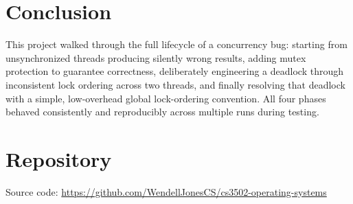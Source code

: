 \documentclass[11pt]{article}
\begin{document}
\section{Conclusion}
This project walked through the full lifecycle of a concurrency bug: starting
from unsynchronized threads producing silently wrong results, adding mutex
protection to guarantee correctness, deliberately engineering a deadlock through
inconsistent lock ordering across two threads, and finally resolving that
deadlock with a simple, low-overhead global lock-ordering convention. All four
phases behaved consistently and reproducibly across multiple runs during
testing.

\section*{Repository}
Source code: \url{https://github.com/WendellJonesCS/cs3502-operating-systems}
\end{document}
